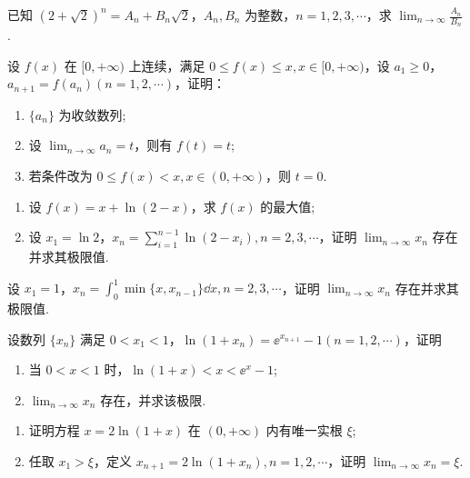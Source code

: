 	\begin{ti}
		已知 $\left( 2 + \sqrt{2} \right)^{n} = A_{n} + B_{n}\sqrt{2}$，$A_{n},B_{n}$ 为整数，$n = 1,2,3,\cdots$，求 $\lim_{n\to \infty} \frac{A_{n}}{B_{n}}$.
	\end{ti}

	\begin{ti}
		设 $f(x)$ 在 $[0,+\infty)$ 上连续，满足 $0 \leq f(x) \leq x, x \in [0,+\infty)$，设 $a_{1} \geq 0$，$a_{n+1} = f(a_{n})(n = 1,2,\cdots)$，证明：
		\begin{enumerate}
			\item $\{ a_{n} \}$ 为收敛数列;
			\item 设 $\lim_{n \to \infty} a_{n} = t$，则有 $f(t) = t$;
			\item 若条件改为 $0 \leq f(x) < x,x \in (0,+\infty)$，则 $t = 0$.
		\end{enumerate}
	\end{ti}

	\begin{ti}
		\begin{enumerate}
			\item 设 $f(x) = x + \ln(2 - x)$，求 $f(x)$ 的最大值;
			\item 设 $x_{1} = \ln 2$，$x_{n} = \sum_{i=1}^{n-1} \ln(2 - x_{i}), n = 2,3,\cdots$，证明 $\lim_{n \to \infty} x_{n}$ 存在并求其极限值.
		\end{enumerate}
	\end{ti}

	\begin{ti}
		设 $x_{1} = 1$，$x_{n} = \int_{0}^{1} \min\{x,x_{n-1}\} \dd{x}, n = 2,3,\cdots$，证明 $\lim_{n \to \infty} x_{n}$ 存在并求其极限值.
	\end{ti}

	\begin{ti}
		设数列 $\{ x_{n} \}$ 满足 $0 < x_{1} < 1$，$\ln(1 + x_{n}) = \ee^{x_{n+1}} - 1(n = 1,2,\cdots)$，证明
		\begin{enumerate}
			\item 当 $0 < x < 1$ 时，$\ln(1 + x) < x < \ee^{x} - 1$;
			\item $\lim_{n \to \infty} x_{n}$ 存在，并求该极限.
		\end{enumerate}
	\end{ti}

	\begin{ti}
		\begin{enumerate}
			\item 证明方程 $x = 2\ln(1 + x)$ 在 $(0,+\infty)$ 内有唯一实根 $\xi$;
			\item 任取 $x_{1} > \xi$，定义 $x_{n+1} = 2\ln(1 + x_{n}), n = 1,2,\cdots$，证明 $\lim_{n \to \infty} x_{n} = \xi$.
		\end{enumerate}
	\end{ti}

